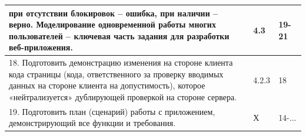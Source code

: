\documentclass[a4paper,12pt]{article}
\begin{document}
\begin{longtable}{|p{7cm}|p{3cm}|p{3cm}|}
    при отсутствии блокировок – ошибка, при наличии – верно.
    Моделирование одновременной работы многих пользователей –
    ключевая часть задания для разработки веб-приложения.                                                 & 4.3                                  & 19-21                                                                                   \\
    \hline
    18. Подготовить демонстрацию изменения на стороне клиента кода страницы
    (кода, ответственного за проверку вводимых данных на стороне клиента на допустимость),
    которое «нейтрализуется» дублирующей проверкой на стороне сервера.                                    & 4.2.3                                & 18                                                                                      \\
    \hline
    19. Подготовить план (сценарий) работы с приложением, демонстрирующий все функции и требования.       & Х                                    & 14-...                                                                                  \\
    \hline
\end{longtable}
\end{document}
